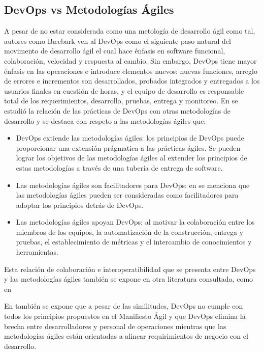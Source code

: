 \documentclass[journal]{IEEEtran}
\begin{document}
\subsection{DevOps vs Metodologías Ágiles}
A pesar de no estar considerada como una metología de desarrollo ágil como tal, autores como Bæebark \cite{henrik-b} ven al DevOps como el siguiente paso natural del movimento de desarrollo ágil el cual hace énfasis en software funcional, colaboración, velocidad y respuesta al cambio. Sin embargo, DevOps tiene mayor énfasis en las operaciones e introduce elementos nuevos: nuevas funciones, arreglo de errores e incrementos son desarrollados, probados integrados y entregados a los usuarios finales en cuestión de horas, y el equipo de desarrollo es responsable total de los requerimientos, desarrollo, pruebas, entrega y monitoreo. En \cite{jabbari-et-al} se estudió la relación de las prácticas de DevOps con otras metodologías de desarrollo y se destaca con respeto a las metodologías ágiles que:
\begin{itemize}
    \item DevOps extiende las metodologías ágiles: los principios de DevOps puede proporcionar una extensión prágmatica a las prácticas ágiles. Se pueden lograr los objetivos de las metodologías ágiles al extender los principios de estas metodologías a través de una tubería de entrega de software.
    \item Las metodologías ágiles son facilitadores para DevOps: en \cite{jabbari-et-al} se menciona que las metodologías ágiles pueden ser consideradas como facilitadores para adoptar los principios detrás de DevOps.
    \item Las metodologías ágiles apoyan DevOps: al motivar la colaboración entre los miembros de los equipos, la automatización de la construcción, entrega y pruebas, el establecimiento de métricas y el intercambio de conocimientos y herramientas. 
\end{itemize}
Esta relación de colaboración e interoperatibilidad que se presenta entre DevOps y las metodologías ágiles también se expone en otra literatura consultada, como en \cite{mitesh-soni}

En \cite{jabbari-et-al} también se expone que a pesar de las similitudes, DevOps no cumple con todos los principios propuestos en el Manifiesto Ágil \cite{agile-manifesto} y que DevOps elimina la brecha entre desarrolladores y personal de operaciones mientras que las metodologías ágiles están orientadas a alinear requirimientos de negocio con el desarrollo.
\end{document}
